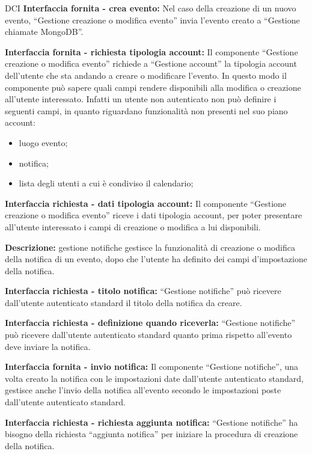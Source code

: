 \begin{listaPersonale}{DCI}
    \textbf{Interfaccia fornita - crea evento:} Nel caso della creazione di un nuovo evento, “Gestione creazione o modifica evento” invia l'evento creato a “Gestione chiamate MongoDB”.

    \textbf{Interfaccia fornita - richiesta tipologia account:} Il componente “Gestione creazione o modifica evento” richiede a “Gestione account”  la tipologia account dell'utente che sta andando a creare o modificare l'evento. In questo modo il componente può sapere quali campi rendere disponibili alla modifica o creazione all'utente interessato. Infatti un utente non autenticato non può definire i seguenti campi, in quanto riguardano funzionalità non presenti nel suo piano account:
    \begin{itemize}
        \item luogo evento;
        \item notifica;
        \item lista degli utenti a cui è condiviso il calendario;
    \end{itemize}

    \textbf{Interfaccia richiesta - dati tipologia account:} Il componente “Gestione creazione o modifica evento” riceve i dati tipologia account, per poter presentare all'utente interessato i campi di creazione o modifica a lui disponibili.



    \textbf{Descrizione:} gestione notifiche gestisce la funzionalità di creazione o modifica della notifica di un evento, dopo che l'utente ha definito dei campi d'impostazione della notifica.

    \textbf{Interfaccia richiesta - titolo notifica:} “Gestione notifiche” può ricevere dall'utente autenticato standard il titolo della notifica da creare.

    \textbf{Interfaccia richiesta - definizione quando riceverla:} “Gestione notifiche” può ricevere dall'utente autenticato standard quanto prima rispetto all'evento deve inviare la notifica.

    \textbf{Interfaccia fornita - invio notifica:} Il componente “Gestione notifiche”, una volta creato la notifica con le impostazioni date dall'utente autenticato standard, gestisce anche l'invio della notifica all'evento secondo le impostazioni poste dall'utente autenticato standard.

    \textbf{Interfaccia richiesta - richiesta aggiunta notifica:} “Gestione notifiche” ha bisogno della richiesta “aggiunta notifica” per iniziare la procedura di creazione della notifica.


\end{listaPersonale}

